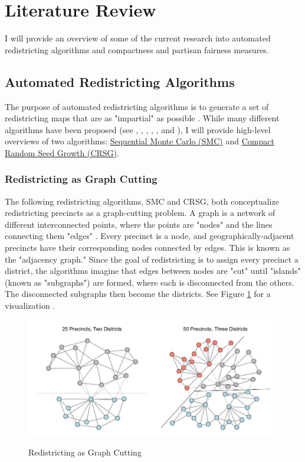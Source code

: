 \section{Literature Review}
\label{sec:litreview}

I will provide an overview of some of the current research into automated redistricting algorithms and compactness and partisan fairness measures. 

\subsection{Automated Redistricting Algorithms}

The purpose of automated redistricting algorithms is to generate a set of redistricting maps that are as "impartial" as possible \parencite{chen2013}. While many different algorithms have been proposed (see \textcite{altman2011}, \textcite{haas2020}, \textcite{lara-caballero2019}, \textcite{macmillan2001}, \textcite{weaver1963}, and \textcite{xiao2008}), I will provide high-level overviews of two algorithms: \hyperref[sec:smc]{Sequential Monte Carlo (SMC)} and \hyperref[sec:crsg]{Compact Random Seed Growth (CRSG)}. 

\subsubsection{Redistricting as Graph Cutting}
\label{sec:redistasgraphcut}


The following redistricting algorithms, SMC and CRSG, both conceptualize redistricting precincts as a graph-cutting problem. A graph is a network of different interconnected points, where the points are "nodes" and the lines connecting them "edges" \parencite{fifield2020}. Every precinct is a node, and geographically-adjacent precincts have their corresponding nodes connected by edges. This is known as the "adjacency graph." Since the goal of redistricting is to assign every precinct a district, the algorithms imagine that edges between nodes are "cut" until "islands" (known as "subgraphs") are formed, where each is disconnected from the others. The disconnected subgraphs then become the districts. See Figure \ref{fig:graphcut} for a visualization \parencite{fifield2020}. 

\begin{figure}[t]
    \caption{Redistricting as Graph Cutting}
    \includegraphics[width=0.8\linewidth]{img/graphcut.png}
    \label{fig:graphcut}
    \raggedright
\end{figure} 

